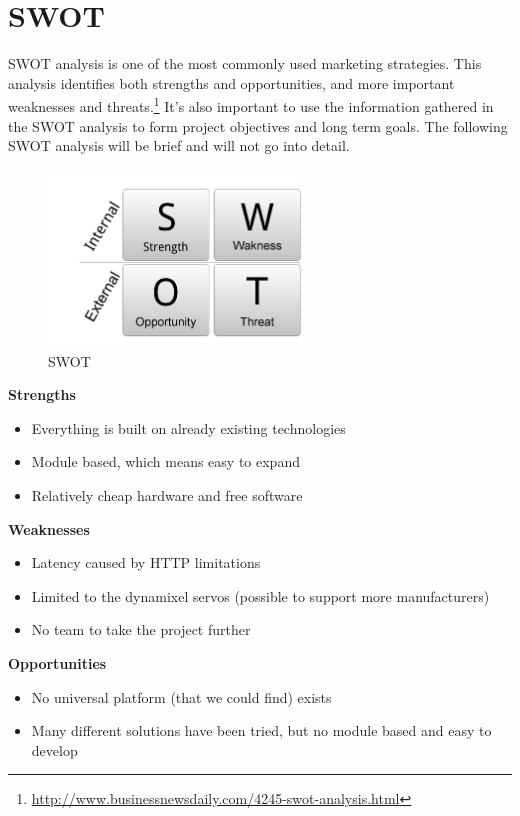 \chapter{SWOT}
SWOT analysis is one of the most commonly used marketing strategies. 
This analysis identifies both strengths and opportunities, and more important weaknesses and threats.\footnote{\url{http://www.businessnewsdaily.com/4245-swot-analysis.html}}
It's also important to use the information gathered in the SWOT analysis to form project objectives and long term goals. 
The following SWOT analysis will be brief and will not go into detail. 
\vspace{\secspace}

\begin{figure}[H]
    \centering
    \includegraphics[width=0.6\textwidth]{graphics/swot.png}	
    \caption{SWOT}
    \label{fig:sw}
\end{figure}

\textbf{\Large Strengths}
\begin{itemize}
	 \item Everything is built on already existing technologies
	 \item Module based, which means easy to expand
	 \item Relatively cheap hardware and free software
\end{itemize}

\textbf{\Large Weaknesses}
\begin{itemize}
	 \item Latency caused by HTTP limitations
	 \item Limited to the dynamixel servos (possible to support more manufacturers)
	 \item No team to take the project further
\end{itemize}

\textbf{\Large Opportunities}
\begin{itemize}
	 \item No universal platform (that we could find) exists
	 \item Many different solutions have been tried, but no module based and easy to develop
\end{itemize}

